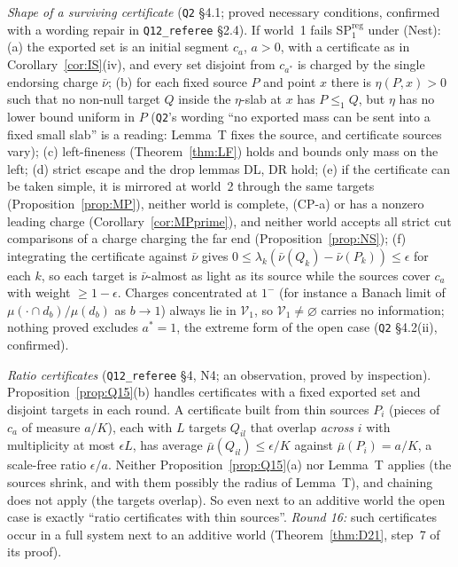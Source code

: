\documentclass[11pt]{article}
\theoremstyle{definition}
\theoremstyle{remark}
\newcommand{\src}[1]{\texttt{#1}}
\begin{document}
\emph{Shape of a surviving certificate} (\src{Q2} \S4.1; proved necessary conditions, confirmed with a wording repair in \src{Q12\_referee} \S2.4). If world~1 fails SP$^{\mathrm{reg}}_1$ under (Nest): (a) the exported set is an initial segment $c_a$, $a>0$, with a certificate as in Corollary~\ref{cor:IS}(iv), and every set disjoint from $c_{a^*}$ is charged by the single endorsing charge $\bar\nu$; (b) for each fixed source $P$ and point $x$ there is $\eta(P,x)>0$ such that no non-null target $Q$ inside the $\eta$-slab at $x$ has $P\le_1Q$, but $\eta$ has no lower bound uniform in $P$ (\src{Q2}'s wording ``no exported mass can be sent into a fixed small slab'' is a reading: Lemma~T fixes the source, and certificate sources vary); (c) left-fineness (Theorem~\ref{thm:LF}) holds and bounds only mass on the left; (d) strict escape and the drop lemmas DL, DR hold; (e) if the certificate can be taken simple, it is mirrored at world~2 through the same targets (Proposition~\ref{prop:MP}), neither world is complete, (CP-a) or has a nonzero leading charge (Corollary~\ref{cor:MPprime}), and neither world accepts all strict cut comparisons of a charge charging the far end (Proposition~\ref{prop:NS}); (f) integrating the certificate against $\bar\nu$ gives $0\le\lambda_k(\bar\nu(Q_k)-\bar\nu(P_k))\le\epsilon$ for each $k$, so each target is $\bar\nu$-almost as light as its source while the sources cover $c_a$ with weight $\ge1-\epsilon$. Charges concentrated at $1^-$ (for instance a Banach limit of $\mu(\cdot\cap d_b)/\mu(d_b)$ as $b\to1$) always lie in $\mathcal V_1$, so $\mathcal V_1\ne\varnothing$ carries no information; nothing proved excludes $a^*=1$, the extreme form of the open case (\src{Q2} \S4.2(ii), confirmed).

\emph{Ratio certificates} (\src{Q12\_referee} \S4, N4; an observation, proved by inspection). Proposition~\ref{prop:Q15}(b) handles certificates with a fixed exported set and disjoint targets in each round. A certificate built from thin sources $P_i$ (pieces of $c_a$ of measure $a/K$), each with $L$ targets $Q_{il}$ that overlap \emph{across} $i$ with multiplicity at most $\epsilon L$, has average $\bar\mu(Q_{il})\le\epsilon/K$ against $\bar\mu(P_i)=a/K$, a scale-free ratio $\epsilon/a$. Neither Proposition~\ref{prop:Q15}(a) nor Lemma~T applies (the sources shrink, and with them possibly the radius of Lemma~T), and chaining does not apply (the targets overlap). So even next to an additive world the open case is exactly ``ratio certificates with thin sources''. \emph{Round 16:} such certificates occur in a full system next to an additive world (Theorem~\ref{thm:D21}, step~7 of its proof).
\end{document}
